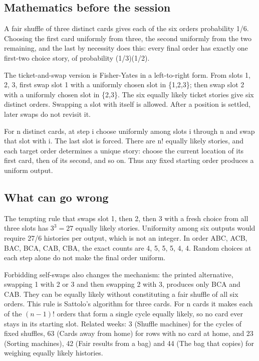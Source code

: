 \subsection*{Mathematics before the session}
A fair shuffle of three distinct cards gives each of the six orders probability 1/6. Choosing the first card uniformly from three, the second uniformly from the two remaining, and the last by necessity does this: every final order has exactly one first-two choice story, of probability (1/3)(1/2).

The ticket-and-swap version is Fisher-Yates in a left-to-right form. From slots 1, 2, 3, first swap slot 1 with a uniformly chosen slot in \{1,2,3\}; then swap slot 2 with a uniformly chosen slot in \{2,3\}. The six equally likely ticket stories give six distinct orders. Swapping a slot with itself is allowed. After a position is settled, later swaps do not revisit it.

For n distinct cards, at step i choose uniformly among slots i through n and swap that slot with i. The last slot is forced. There are n! equally likely stories, and each target order determines a unique story: choose the current location of its first card, then of its second, and so on. Thus any fixed starting order produces a uniform output.

\subsection*{What can go wrong}
The tempting rule that swaps slot 1, then 2, then 3 with a fresh choice from all three slots has $3^3 = 27$ equally likely stories. Uniformity among six outputs would require 27/6 histories per output, which is not an integer. In order ABC, ACB, BAC, BCA, CAB, CBA, the exact counts are 4, 5, 5, 5, 4, 4. Random choices at each step alone do not make the final order uniform.

Forbidding self-swaps also changes the mechanism: the printed alternative, swapping 1 with 2 or 3 and then swapping 2 with 3, produces only BCA and CAB. They can be equally likely without constituting a fair shuffle of all six orders. This rule is Sattolo's algorithm for three cards. For n cards it makes each of the $(n-1)!$ orders that form a single cycle equally likely, so no card ever stays in its starting slot. Related weeks: 3 (Shuffle machines) for the cycles of fixed shuffles, 63 (Cards away from home) for rows with no card at home, and 23 (Sorting machines), 42 (Fair results from a bag) and 44 (The bag that copies) for weighing equally likely histories.

